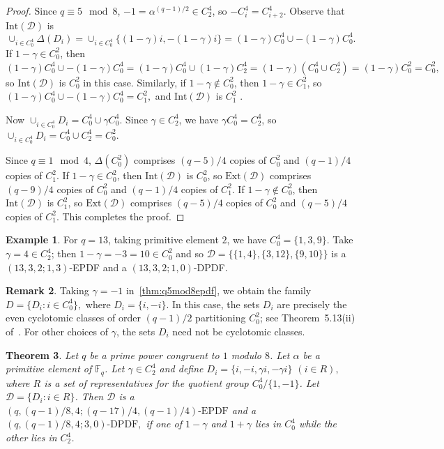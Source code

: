 \documentclass[12pt, a4paper]{article}
\newtheorem{theorem}{Theorem}[section]
\theoremstyle{definition}
\newtheorem{example}[theorem]{Example}
\newtheorem{remark}[theorem]{Remark}
\begin{document}
\begin{proof}
	Since $q \equiv 5 \mod 8$, $-1=\alpha^{(q-1)/2} \in C_2^4$, so $-C_i^4=C_{i+2}^4$. Observe that $\mathrm{Int}(\mathcal{D})$ is 
	\[
	\cup_{i \in C_0^4} \Delta(D_i)
	=
	\cup_{i \in C_0^4} \{(1-\gamma)i,-(1-\gamma)i\}
	=
	(1-\gamma)C_0^4 \cup -(1-\gamma)C_0^4.
	\]
		If $1-\gamma \in C_0^2$, then
	$
	(1-\gamma)C_0^4 \cup -(1-\gamma)C_0^4
	=
	(1-\gamma)C_0^4 \cup (1-\gamma)C_2^4
	=
	(1-\gamma)(C_0^4 \cup C_2^4)
	=
	(1-\gamma)C_0^2
	=
	C_0^2,
	$ 
	so $\mathrm{Int}(\mathcal{D})$ is $C_0^2$ in this case.
		Similarly, if $1-\gamma \notin C_0^2$, then $1-\gamma \in C_1^2$, so
	$
	(1-\gamma)C_0^4 \cup -(1-\gamma)C_0^4
=	C_1^2,
	$ 
	and $\mathrm{Int}(\mathcal{D})$ is $C_1^2$ . 
	
	Now
	$
	\cup_{ i \in C_0^4} D_i= C_0^4 \cup \gamma C_0^4.
	$ 
	Since $\gamma \in C_2^4$, we have $\gamma C_0^4=C_2^4$, so
	$
	\cup_{i \in C_0^4 } D_i=C_0^4 \cup C_2^4=C_0^2.
	$ 
	
	Since $q \equiv 1 \mod 4$, $\Delta(C_0^2)$ comprises $(q-5)/4$ copies of $C_0^2$ and $(q-1)/4$ copies of $C_1^2$.  If $1-\gamma \in C_0^2$, then $\mathrm{Int}(\mathcal{D})$ is $C_0^2$, so $\mathrm{Ext}(\mathcal{D})$ comprises $(q-9)/4$ copies of $C_0^2$ and $(q-1)/4$ copies of $C_1^2$.  If $1-\gamma \notin C_0^2$, then $\mathrm{Int}(\mathcal{D})$ is $C_1^2$, so $\mathrm{Ext}(\mathcal{D})$ comprises $(q-5)/4$ copies of $C_0^2$ and $(q-5)/4$ copies of $C_1^2$. This completes the proof.
\end{proof}
\begin{example}
For $q=13$, taking primitive element $2$, we have $C_0^4=\{1,3,9\}$.  Take $\gamma=4 \in C_2^4$; then $1-\gamma=-3=10 \in C_0^2$ and so $\mathcal{D}=\{ \{1,4\}, \{3,12\}, \{9,10\}\}$ is a $(13,3,2;1,3)$-EPDF and a $(13,3,2;1,0)$-DPDF.
\end{example}

\begin{remark}
	Taking $\gamma=-1$ in~\ref{thm:q5mod8epdf}, we obtain the family
	$
	D=\{D_i : i \in C_0^4\},
	$ 
	where $D_i=\{i,-i\}$. In this case, the sets $D_i$ are precisely the even cyclotomic classes of order $(q-1)/2$ partitioning $C_0^2$; see Theorem~5.13(ii) of~\cite{HucJoh}. For other choices of $\gamma$, the sets $D_i$ need not be cyclotomic classes.
\end{remark}

\begin{theorem}\label{thm:q1mod8epdf}
	Let $q$ be a prime power congruent to $1$ modulo $8$. Let $\alpha$ be a primitive element of $\mathbb{F}_q$. Let $\gamma \in C_2^4$ and define
	$
	D_i=\{i,-i,\gamma i,-\gamma i\}$ $  (i \in R),
	$ 
	where $R$ is a set of representatives for the quotient group $C_0^4/\{1,-1\}$. Let $\mathcal{D}=\{D_i: i \in R\}$. Then $\mathcal{D}$ is a
	$
	(q,(q-1)/8,4;(q-17)/4,(q-1)/4)\text{-EPDF}
	$ 
	and a
	$ 
	(q,(q-1)/8,4;3,0)\text{-DPDF},
	$ 
	if one of $1-\gamma$ and $1+\gamma$ lies in $C_0^4$ while the other lies in $C_2^4$.
\end{theorem}
\end{document}
